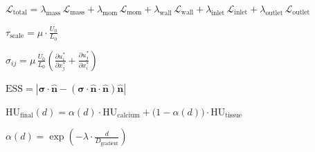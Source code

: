 \documentclass[12pt, border=10pt]{standalone}
\begin{document}

$\displaystyle
\mathcal{L}_{\text{total}} = \lambda_{\text{mass}}\,\mathcal{L}_{\text{mass}} + \lambda_{\text{mom}}\,\mathcal{L}_{\text{mom}} + \lambda_{\text{wall}}\,\mathcal{L}_{\text{wall}} + \lambda_{\text{inlet}}\,\mathcal{L}_{\text{inlet}} + \lambda_{\text{outlet}}\,\mathcal{L}_{\text{outlet}}
$



$\displaystyle
\tau_{\text{scale}} = \mu \cdot \frac{U_0}{L_0}
$



$\displaystyle
\sigma_{ij} = \mu\,\frac{U_0}{L_0} \left(\frac{\partial u_i^*}{\partial x_j^*} + \frac{\partial u_j^*}{\partial x_i^*}\right)
$



$\displaystyle
\text{ESS} = \left| \bm{\sigma} \cdot \hat{\mathbf{n}} - \left(\bm{\sigma} \cdot \hat{\mathbf{n}} \cdot \hat{\mathbf{n}}\right)\hat{\mathbf{n}} \right|
$



$\displaystyle
\text{HU}_{\text{final}}(d) = \alpha(d) \cdot \text{HU}_{\text{calcium}} + \big(1 - \alpha(d)\big) \cdot \text{HU}_{\text{tissue}}
$



$\displaystyle
\alpha(d) = \exp\!\left(-\lambda \cdot \frac{d}{D_{\text{gradient}}}\right)
$
\end{document}
